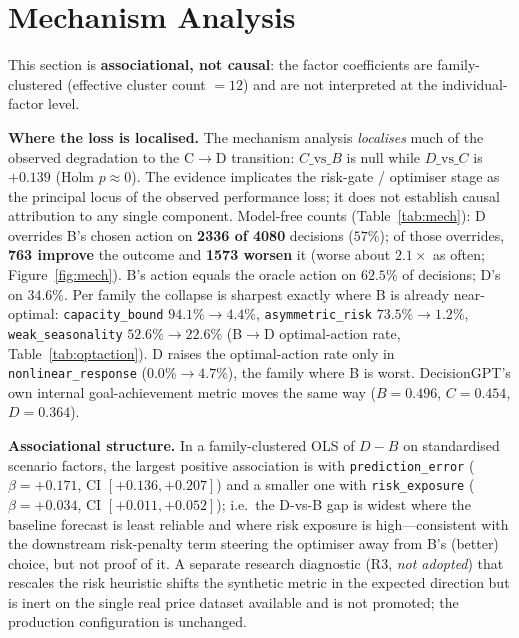 \documentclass[10pt,twocolumn,a4paper]{article}
\newcommand{\code}[1]{\texttt{#1}}
\newcommand{\dvb}{\ensuremath{D\!-\!B}}
\begin{document}
\section{Mechanism Analysis}\label{sec:mech}
This section is \textbf{associational, not causal}: the factor coefficients are
family-clustered (effective cluster count $=12$) and are not interpreted at the
individual-factor level.

\textbf{Where the loss is localised.} The mechanism analysis \emph{localises}
much of the observed degradation to the C$\to$D transition: $C\text{\_vs\_}B$ is
null while $D\text{\_vs\_}C$ is $+0.139$ (Holm $p\approx0$). The evidence
implicates the risk-gate / optimiser stage as the principal locus of the
observed performance loss; it does not establish causal attribution to any
single component. Model-free counts (Table~\ref{tab:mech}): D overrides B's
chosen action on \textbf{2336 of 4080} decisions ($57\%$); of those overrides,
\textbf{763 improve} the outcome and \textbf{1573 worsen} it (worse about
$2.1\times$ as often; Figure~\ref{fig:mech}). B's action equals the oracle
action on $62.5\%$ of decisions; D's on $34.6\%$. Per family the collapse is
sharpest exactly where B is already near-optimal:
\code{capacity\_bound} $94.1\%\!\to\!4.4\%$,
\code{asymmetric\_risk} $73.5\%\!\to\!1.2\%$,
\code{weak\_seasonality} $52.6\%\!\to\!22.6\%$ (B$\to$D optimal-action rate,
Table~\ref{tab:optaction}). D raises the optimal-action rate only in
\code{nonlinear\_response} ($0.0\%\!\to\!4.7\%$), the family where B is worst.
DecisionGPT's own internal goal-achievement metric moves the same way
($B=0.496$, $C=0.454$, $D=0.364$).

\textbf{Associational structure.} In a family-clustered OLS of $\dvb$ on
standardised scenario factors, the largest positive association is with
\code{prediction\_error} ($\beta=+0.171$, CI $[+0.136,+0.207]$) and a smaller
one with \code{risk\_exposure} ($\beta=+0.034$, CI $[+0.011,+0.052]$); i.e.\ the
D-vs-B gap is widest where the baseline forecast is least reliable and where risk
exposure is high---consistent with the downstream risk-penalty term steering the
optimiser away from B's (better) choice, but not proof of it. A separate
research diagnostic (R3, \emph{not adopted}) that rescales the risk heuristic
shifts the synthetic metric in the expected direction but is inert on the single
real price dataset available and is not promoted; the production configuration is
unchanged.
\end{document}
